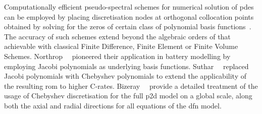
Computationally  efficient pseudo-spectral  schemes  for  numerical solution  of
\glspl{pde}  can  be employed  by  placing  discretisation nodes  at  orthogonal
collocation  points obtained  by  solving  for the  zeros  of  certain class  of
polynomial basis
functions~\cite{Ferguson1971,Trefethen2000,Boyd2001,Shizgal2015,Dutykh2016}.
The  accuracy  of such  schemes  extend  beyond  the  algebraic orders  of  that
achievable with  classical Finite  Difference, Finite  Element or  Finite Volume
Schemes.  Northrop~\etal{}~\cite{Northrop2011}  pioneered their  application  in
battery modelling by employing Jacobi polynomials as underlying basis functions.
Suthar~\etal{}~\cite{Suthar2014}  replaced  Jacobi  polynomials  with  Chebyshev
polynomials to  extend the  applicability of the  resulting \gls{rom}  to higher
C-rates. Bizeray~\etal{}~\cite{Bizeray2015} provide a  detailed treatment of the
usage  of Chebyshev  discretisation for  the full  \gls{p2d} model  on a  global
scale, \ie{} along both the axial and radial directions for all equations of the
\gls{dfn} model.



